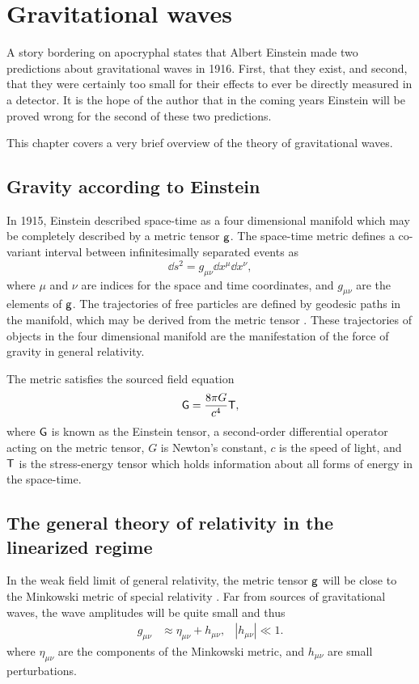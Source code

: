 \chapter{Gravitational waves}
\label{ch:gws}
A story bordering on apocryphal states that Albert Einstein made two predictions about gravitational waves in 1916. %
First, that they exist, and second, that they were certainly too small for their effects to ever be directly measured in a detector. %
It is the hope of the author that in the coming years Einstein will be proved wrong for the second of these two predictions.

This chapter covers a very brief overview of the theory of gravitational waves. %


\section{Gravity according to Einstein}
In 1915, Einstein described space-time as a four dimensional manifold which may be completely described by a metric tensor $\mathsf{g}$. %
The space-time metric defines a co-variant interval between infinitesimally separated events as
\begin{equation}
\dd s^2 = g_{\mu \nu}\dd x^\mu \dd x^\nu,
\end{equation}
where $\mu$ and $\nu$ are indices for the space and time coordinates, and $g_{\mu \nu}$ are the elements of $\mathsf{g}$. %
The trajectories of free particles are defined by geodesic paths in the manifold, which may be derived from the metric tensor \cite[Chap. %
3]{carroll2004spacetime}. %
These trajectories of objects in the four dimensional manifold are the manifestation of the force of gravity in general relativity.

The metric satisfies the sourced field equation
\begin{equation}
\label{eqn:einstein}
\mathsf{G}=\frac{8\pi G}{c^4}\mathsf{T},
\end{equation}
where $\mathsf{G}$ is known as the Einstein tensor, a second-order differential operator acting on the metric tensor, $G$ is Newton's constant, $c$ is the speed of light, and $\mathsf{T}$ is the stress-energy tensor which holds information about all forms of energy in the space-time.

\section{The general theory of relativity in the linearized regime}
In the weak field limit of general relativity, the metric tensor $\mathsf{g}$ will be close to the Minkowski metric of special relativity \cite[Chap. %
7]{carroll2004spacetime}. %
Far from sources of gravitational waves, the wave amplitudes will be quite small and thus
\begin{align}
g_{\mu \nu}&\approx \eta_{\mu \nu}+h_{\mu \nu}, &|h_{\mu \nu}|\ll 1.
\end{align}
where $\eta_{\mu \nu}$ are the components of the Minkowski metric, and $h_{\mu \nu}$ are small perturbations.

